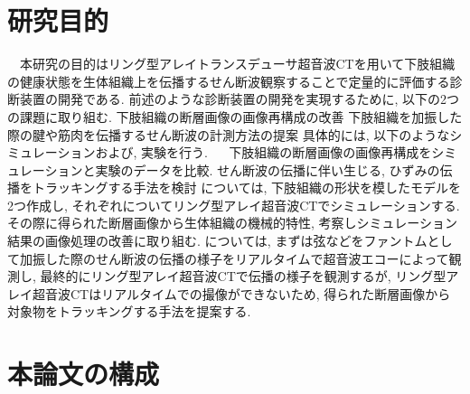 \section{研究目的}
　本研究の目的はリング型アレイトランスデューサ超音波CTを用いて下肢組織の健康状態を生体組織上を伝播するせん断波観察することで定量的に評価する診断装置の開発である. 前述のような診断装置の開発を実現するために, 以下の2つの課題に取り組む. 
下肢組織の断層画像の画像再構成の改善
下肢組織を加振した際の腱や筋肉を伝播するせん断波の計測方法の提案
具体的には, 以下のようなシミュレーションおよび, 実験を行う.
　   下肢組織の断層画像の画像再構成をシミュレーションと実験のデータを比較.
        せん断波の伝播に伴い生じる, ひずみの伝播をトラッキングする手法を検討
については, 下肢組織の形状を模したモデルを2つ作成し, それぞれについてリング型アレイ超音波CTでシミュレーションする. その際に得られた断層画像から生体組織の機械的特性, 考察しシミュレーション結果の画像処理の改善に取り組む. については, まずは弦などをファントムとして加振した際のせん断波の伝播の様子をリアルタイムで超音波エコーによって観測し, 最終的にリング型アレイ超音波CTで伝播の様子を観測するが, リング型アレイ超音波CTはリアルタイムでの撮像ができないため, 得られた断層画像から対象物をトラッキングする手法を提案する. 


\section{本論文の構成}





